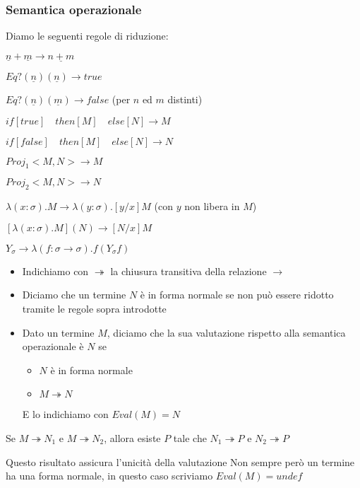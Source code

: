 \documentclass{beamer}
\begin{document}
\begin{frame}
	
	\frametitle{Semantica operazionale}
	
	Diamo le seguenti regole di riduzione:
	\begin{description}
		\item[add] $\underline{n}+\underline{m} \rightarrow \underline{n+m}$
		\item[Eq?] $Eq?(\underline{n})(\underline{n})\rightarrow true$
		\item $Eq?(\underline{n})(\underline{m})\rightarrow false$ (per $n$ ed $m$ distinti)
		\item[cond] $if[true]\quad then[M]\quad else[N] \rightarrow M$
		\item $if[false]\quad then[M]\quad else[N] \rightarrow N$
		\item[proj] $Proj_1<M,N> \rightarrow M$
		\item $Proj_2<M,N> \rightarrow N$
		\item[$\alpha$] $\lambda (x:\sigma).M \rightarrow \lambda (y:\sigma).[y/x]M$ (con $y$ non libera in $M$)
		\item[$\beta$] $[\lambda(x:\sigma).M](N) \rightarrow [N/x]M$
		\item[$Y$] $Y_{\sigma} \rightarrow \lambda (f:\sigma \rightarrow \sigma).f(Y_{\sigma}f)$
	\end{description}
	
\end{frame}

\begin{frame}
	\begin{itemize}
		\item Indichiamo con $\twoheadrightarrow$ la chiusura transitiva della relazione $\rightarrow$
		\item Diciamo che un termine $N$ è in forma normale se non può essere ridotto tramite le regole sopra introdotte
		\item Dato un termine $M$, diciamo che la sua valutazione rispetto alla semantica operazionale è $N$ se
		\begin{itemize}
			\item $N$ è in forma normale
			\item $M \twoheadrightarrow N$
		\end{itemize}
		E lo indichiamo con $Eval(M)=N$
	\end{itemize}
	
	\begin{theorem}
		Se $M \twoheadrightarrow N_1$ e $M \twoheadrightarrow N_2$, allora esiste $P$ tale che $N_1 \twoheadrightarrow P$ e $N_2 \twoheadrightarrow P$
	\end{theorem}
	
	Questo risultato assicura l'unicità della valutazione
	Non sempre però un termine ha una forma normale, in questo caso scriviamo $Eval(M)=undef$
	
\end{frame}
\end{document}
